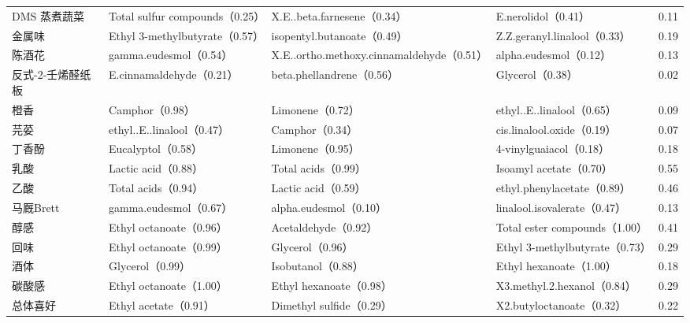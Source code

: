 \begin{table}[H]
\begin{fittable}
\begin{tabular}{@{}llllr@{}}
DMS 蒸煮蔬菜 & Total sulfur compounds（0.25） & X.E..beta.farnesene（0.34） & E.nerolidol（0.41） & 0.11 \\
金属味 & Ethyl 3-methylbutyrate（0.57） & isopentyl.butanoate（0.49） & Z.Z.geranyl.linalool（0.33） & 0.19 \\
陈酒花 & gamma.eudesmol（0.54） & X.E..ortho.methoxy.cinnamaldehyde（0.51） & alpha.eudesmol（0.12） & 0.13 \\
反式-2-壬烯醛纸板 & E.cinnamaldehyde（0.21） & beta.phellandrene（0.56） & Glycerol（0.38） & 0.02 \\
橙香 & Camphor（0.98） & Limonene（0.72） & ethyl..E..linalool（0.65） & 0.09 \\
芫荽 & ethyl..E..linalool（0.47） & Camphor（0.34） & cis.linalool.oxide（0.19） & 0.07 \\
丁香酚 & Eucalyptol（0.58） & Limonene（0.95） & 4-vinylguaiacol（0.18） & 0.18 \\
乳酸 & Lactic acid（0.88） & Total acids（0.99） & Isoamyl acetate（0.70） & 0.55 \\
乙酸 & Total acids（0.94） & Lactic acid（0.59） & ethyl.phenylacetate（0.89） & 0.46 \\
马厩Brett & gamma.eudesmol（0.67） & alpha.eudesmol（0.10） & linalool.isovalerate（0.47） & 0.13 \\
醇感 & Ethyl octanoate（0.96） & Acetaldehyde（0.92） & Total ester compounds（1.00） & 0.41 \\
回味 & Ethyl octanoate（0.99） & Glycerol（0.96） & Ethyl 3-methylbutyrate（0.73） & 0.29 \\
酒体 & Glycerol（0.99） & Isobutanol（0.88） & Ethyl hexanoate（1.00） & 0.18 \\
碳酸感 & Ethyl octanoate（1.00） & Ethyl hexanoate（0.98） & X3.methyl.2.hexanol（0.84） & 0.29 \\
总体喜好 & Ethyl acetate（0.91） & Dimethyl sulfide（0.29） & X2.butyloctanoate（0.32） & 0.22 \\
\bottomrule
\end{tabular}
\end{fittable}
\end{table}